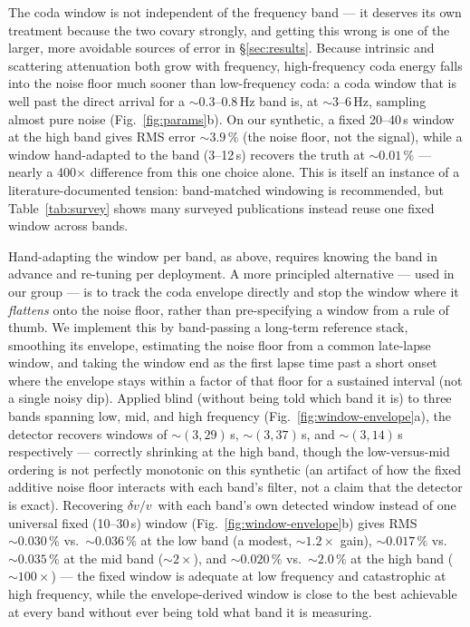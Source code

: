 \documentclass[
  referee]{gji}
\providecommand{\dvv}{\ensuremath{\delta v/v}}
\begin{document}
The coda window is not independent of the frequency band --- it deserves
its own treatment because the two covary strongly, and getting this
wrong is one of the larger, more avoidable sources of error in
\S\ref{sec:results}. Because intrinsic and scattering attenuation both
grow with frequency, high-frequency coda energy falls into the noise
floor much sooner than low-frequency coda: a coda window that is well
past the direct arrival for a \(\sim\!0.3\)--\(0.8\,\)Hz band is, at
\(\sim\!3\)--\(6\,\)Hz, sampling almost pure noise
(Fig.~\ref{fig:params}b). On our synthetic, a fixed 20--40\(\,\)s window
at the high band gives RMS error \(\sim\!3.9\,\%\) (the noise floor, not
the signal), while a window hand-adapted to the band (3--12\(\,\)s)
recovers the truth at \(\sim\!0.01\,\%\) --- nearly a 400\(\times\)
difference from this one choice alone. This is itself an instance of a
literature-documented tension: band-matched windowing is recommended,
but Table~\ref{tab:survey} shows many surveyed publications instead
reuse one fixed window across bands.

Hand-adapting the window per band, as above, requires knowing the band
in advance and re-tuning per deployment. A more principled alternative
--- used in our group --- is to track the coda envelope directly and
stop the window where it \emph{flattens} onto the noise floor, rather
than pre-specifying a window from a rule of thumb. We implement this by
band-passing a long-term reference stack, smoothing its envelope,
estimating the noise floor from a common late-lapse window, and taking
the window end as the first lapse time past a short onset where the
envelope stays within a factor of that floor for a sustained interval
(not a single noisy dip). Applied blind (without being told which band
it is) to three bands spanning low, mid, and high frequency
(Fig.~\ref{fig:window-envelope}a), the detector recovers windows of
\(\sim\!(3,29)\,\)s, \(\sim\!(3,37)\,\)s, and \(\sim\!(3,14)\,\)s
respectively --- correctly shrinking at the high band, though the
low-versus-mid ordering is not perfectly monotonic on this synthetic (an
artifact of how the fixed additive noise floor interacts with each
band's filter, not a claim that the detector is exact). Recovering
\dvv~with each band's own detected window instead of one universal fixed
(10--30\(\,\)s) window (Fig.~\ref{fig:window-envelope}b) gives RMS
\(\sim\!0.030\,\%\) vs.~\(\sim\!0.036\,\%\) at the low band (a modest,
\(\sim\!1.2\times\) gain), \(\sim\!0.017\,\%\) vs.~\(\sim\!0.035\,\%\)
at the mid band (\(\sim\!2\times\)), and \(\sim\!0.020\,\%\)
vs.~\(\sim\!2.0\,\%\) at the high band (\(\sim\!100\times\)) --- the
fixed window is adequate at low frequency and catastrophic at high
frequency, while the envelope-derived window is close to the best
achievable at every band without ever being told what band it is
measuring.
\end{document}
